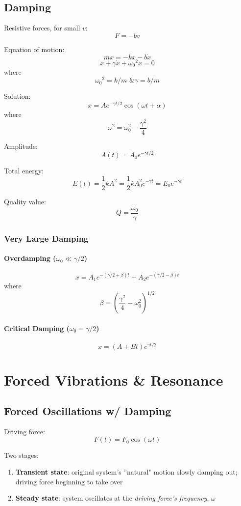 \documentclass[11pt,letterpaper,titlepage,oneside]{book}
\begin{document}
\section{Damping}
Resistive forces, for small $v$: \[ F=-bv \]

Equation of motion:
\[ m\ddot{x} = -kx - b\dot{x} \]
\[ \ddot{x} + \gamma \dot{x} + {\omega_0}^2 x = 0 \]
where
\[ {\omega_0}^2 = k/m \text{ \& } \gamma = b/m \]

Solution:
\[ x = A e^{-\gamma t/2} \cos(\omega t + \alpha) \]
where
\[ \omega ^2 = \omega_0^2 - \frac{\gamma^2}{4} \]

Amplitude:
\[ A(t) = A_0 e^{-\gamma t/2} \]

Total energy:
\[ E(t) = \frac{1}{2}kA^2 = \frac{1}{2}kA_0^2 e^{-\gamma t} = E_0 e^{-\gamma t} \]

Quality value:
\[ Q = \frac{\omega_0}{\gamma} \]

\subsection{Very Large Damping}
\subsubsection{Overdamping ($ \omega_0 \ll \gamma/2 $)}
\[ x = A_1 e^{-(\gamma/2 + \beta)t} + A_2 e^{-(\gamma/2-\beta)t} \]
where \[ \beta = \left(\frac{\gamma^2}{4}-\omega_0^2 \right)^{1/2} \]

\subsubsection{Critical Damping ($ \omega_0 = \gamma/2 $)}
\[ x = (A + Bt) e^{\gamma t/2}\]

\chapter{Forced Vibrations \& Resonance}
\section{Forced Oscillations w/ Damping}
Driving force:
\[ F(t) = F_0 \cos(\omega t) \]

Two stages:
\begin{enumerate}
\item \textbf{Transient state}: original system's ''natural" motion slowly damping out; driving force beginning to take over
\item \textbf{Steady state}: system oscillates at the \emph{driving force's frequency}, $\omega$
\end{enumerate}
\end{document}
